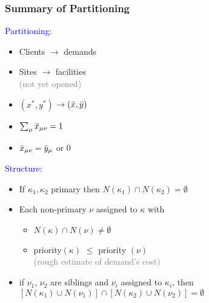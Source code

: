 \documentclass[hyperref,dvipsnames,svgnames]{beamer}
\begin{document}
\begin{frame}
  \frametitle{Summary of Partitioning}

\begin{minipage}{2in}
\noindent \textcolor{blue}{Partitioning:}
\noindent
\begin{itemize}\addtolength{\itemsep}{0.5\baselineskip}
	\item Clients $\rightarrow$ demands
	\item Sites $\rightarrow$ facilities
			\\ \textcolor{gray}{(not yet opened)}
	\item $(x^\ast,y^\ast)$ $\rightarrow ({\bar x},{\bar y})$
	\item $\sum_{\mu}{\bar x}_{\mu\nu} = 1$
	\item ${\bar x}_{\mu\nu} = {\bar y}_\mu$ or $0$
\end{itemize}
\vspace{0.4in}{\ }
\end{minipage}
\hspace{-0.5in}
\pause
\begin{minipage}{2.6in}
\noindent \textcolor{blue}{Structure:}
\noindent
  \begin{itemize}\addtolength{\itemsep}{1\baselineskip}
  \item If $\kappa_1,\kappa_2$ primary then $N(\kappa_1)\cap N(\kappa_2) = \emptyset$
  \item Each non-primary $\nu$ assigned to $\kappa$ with 
	\begin{itemize}
		\item $N(\kappa)\cap N(\nu) \neq \emptyset$
		\item priority$(\kappa)$ $\le$ priority $(\nu)$
		\\
		\textcolor{gray}{(rough estimate of demand's cost)}
	\end{itemize}
  \item if $\nu_1$, $\nu_2$ are siblings and 
		$\nu_i$ assigned to $\kappa_i$, then
		$[N(\kappa_1) \cup N(\nu_1)] \cap [N(\kappa_2) \cup N(\nu_2)] = \emptyset$
  \end{itemize}
\end{minipage}
\end{frame}



\end{document}
